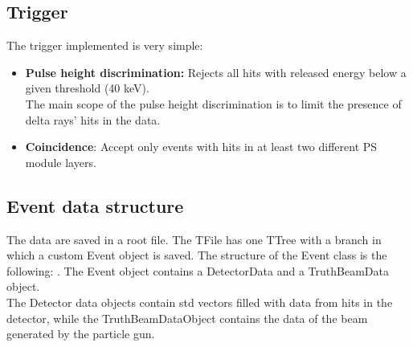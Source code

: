 \documentclass[10pt, a4paper, twocolumn]{article} %
\begin{document}
\subsection{Trigger}
The trigger implemented is very simple:
\begin{itemize}
    \item \textbf{Pulse height discrimination:} Rejects all hits with released energy below a given threshold (40 keV).
    \\
    The main scope of the pulse height discrimination is to limit the presence of delta rays' hits in the data.
    \item \textbf{Coincidence}: Accept only events with hits in at least two different PS module layers.
\end{itemize}

\subsection{Event data structure}
The data are saved in a root file. The TFile has one TTree with a branch in which a custom Event object is saved.
The structure of the Event class is the following:
.
\newline
The Event object contains a DetectorData and a TruthBeamData object.\\
The Detector data objects contain std vectors filled with data from hits in the detector, while the TruthBeamDataObject contains the data of the beam generated by the particle gun.
\end{document}
